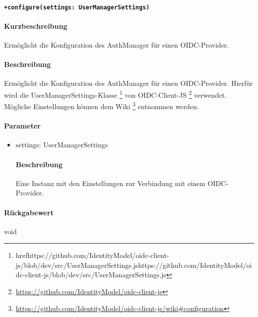 \paragraph{\texttt{+configure(settings: UserManagerSettings)}}%
\paragraph*{Kurzbeschreibung}
Ermöglicht die Konfiguration des AuthManager für einen OIDC-Provider.
\paragraph*{Beschreibung}
Ermöglicht die Konfiguration des AuthManager für einen OIDC-Provider.
Hierfür wird die UserManagerSettings-Klasse \footnote{href{https://github.com/IdentityModel/oidc-client-js/blob/dev/src/UserManagerSettings.js}{https://github.com/IdentityModel/oidc-client-js/blob/dev/src/UserManagerSettings.js}} von 
OIDC-Client-JS \footnote{\href{https://github.com/IdentityModel/oidc-client-js}{https://github.com/IdentityModel/oidc-client-js}} verwendet.
Mögliche Einstellungen können dem Wiki \footnote{\href{https://github.com/IdentityModel/oidc-client-js/wiki\#configuration}{https://github.com/IdentityModel/oidc-client-js/wiki\#configuration}} entnommen werden.
\paragraph*{Parameter}
\begin{itemize}
    \item settings: UserManagerSettings
            \paragraph*{Beschreibung}
            Eine Instanz mit den Einstellungen zur Verbindung mit einem OIDC-Provider.
\end{itemize}
\paragraph*{Rückgabewert}
void